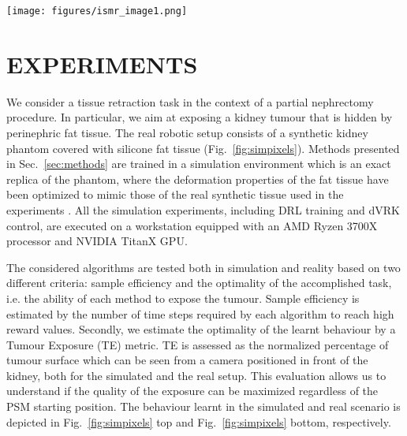 \documentclass[letterpaper, 10 pt, conference]{ieeeconf}
\begin{document}
\begin{figure*}[thpb]
	\centering
	\texttt{[image: figures/ismr\_image1.png]}
	\caption{Sequence of action frames for task completion in simulation (top) and reality (bottom). From left to right: approach, grasp, retract, tumour exposure. (top) Perspective of the simulated camera is overlaid on the bottom left of the simulator frames. (bottom) The real camera is placed in the same position as in the simulation (which do not correspond to the viewpoint used to take these pictures)
	The colour segmentation using a circular mask is illustrated for all the configurations (a) 0\% exposure (b) 0\% exposure (c)$\sim$15\% exposure (b) 100\% exposure.} 
	\label{fig:simpixels}
\end{figure*}
\section{EXPERIMENTS\label{sec:experiments}}

We consider a tissue retraction task in the context of a partial nephrectomy procedure. In particular, we aim at exposing a kidney tumour that is hidden by perinephric fat tissue. The real robotic setup consists of a synthetic kidney phantom covered with silicone fat tissue (Fig.~\ref{fig:simpixels}). Methods presented in Sec.~\ref{sec:methods} are trained in a simulation environment which is an exact replica of the phantom, where the deformation properties of the fat tissue have been optimized to mimic those of the real synthetic tissue used in the experiments \cite{tagliabue2020soft}. All the simulation experiments, including DRL training and dVRK control, are executed on a  workstation equipped with an AMD Ryzen 3700X processor and  NVIDIA TitanX GPU.

The considered algorithms are tested both in simulation and reality based on two different criteria: sample efficiency and the optimality of the accomplished task, i.e. the ability of each method to expose the tumour. Sample efficiency is estimated by the number of time steps required by each algorithm to reach high reward values. Secondly, we estimate the optimality of the learnt behaviour by a Tumour Exposure (TE) metric. TE is assessed as the normalized percentage of tumour surface which can be seen from a camera positioned in front of the kidney, both for the simulated and the real setup. This evaluation allows us to understand if the quality of the exposure can be maximized regardless of the PSM starting position.
The behaviour learnt in the simulated and real scenario is depicted in Fig.~\ref{fig:simpixels} top and Fig.~\ref{fig:simpixels} bottom, respectively.
\end{document}

